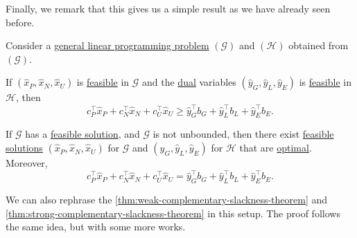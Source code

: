 Finally, we remark that this gives us a simple result as we have already seen before.
\begin{theorem*}
	Consider a \hyperref[def:general-linear-programming-problem]{general linear programming problem} \((\mathcal{G})\) and \((\mathcal{H})\) obtained from \((\mathcal{G})\).
	\begin{theorem}\label{thm:weak-duality-general-LP}
		If \((\hat{x}_P, \hat{x}_N, \hat{x}_U)\) is \hyperref[def:feasible-solution]{feasible} in \(\mathcal{G}\) and the \hyperref[def:dual]{dual} variables \((\hat{y}_G, \hat{y}_L, \hat{y}_E)\) is \hyperref[def:feasible-solution]{feasible} in \(\mathcal{H}\), then
		\[
			c^{\top}_P \hat{x}_P + c^{\top}_N \hat{x}_N + c^{\top}_U \hat{x}_U \geq \hat{y}^{\top}_G b_G + \hat{y}^{\top}_L b_L + \hat{y}^{\top}_E b_E.
		\]
	\end{theorem}
	\begin{theorem}\label{thm:strong-duality-general-LP}
		If \(\mathcal{G}\) has a \hyperref[def:feasible-solution]{feasible solution}, and \(\mathcal{G}\) is not unbounded, then there exist \hyperref[def:feasible-solution]{feasible solutions} \((\hat{x}_P, \hat{x}_N, \hat{x}_U)\) for \(\mathcal{G}\) and \((\hat{y}_G, \hat{y}_L, \hat{y}_E)\) for \(\mathcal{H}\) that are \hyperref[def:optimal-solution]{optimal}. Moreover,
		\[
			c^{\top}_P \hat{x}_P + c^{\top}_N \hat{x}_N + c^{\top}_U \hat{x}_U = \hat{y}^{\top}_G b_G + \hat{y}^{\top}_L b_L + \hat{y}^{\top}_E b_E.
		\]
	\end{theorem}
\end{theorem*}

\begin{remark}
	We can also rephrase the \autoref{thm:weak-complementary-slackness-theorem} and \autoref{thm:strong-complementary-slackness-theorem} in this setup. The proof follows the same idea, but with some more works.
\end{remark}